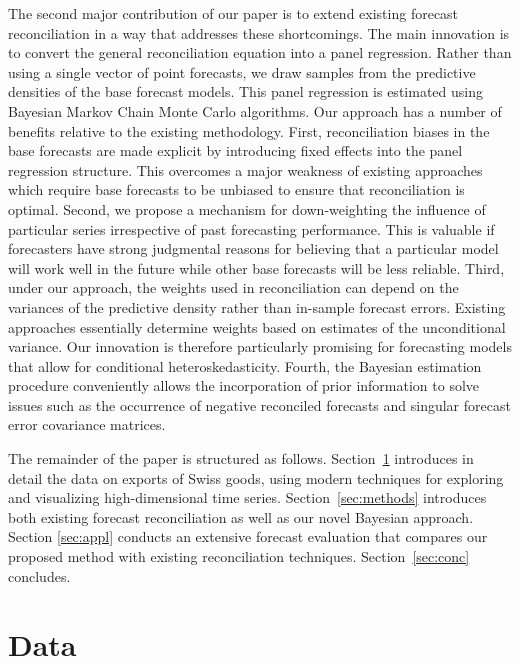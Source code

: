 \documentclass[a4paper,fleqn,11pt]{article}
\begin{document}
The second major contribution of our paper is to extend existing forecast reconciliation in a way that addresses these shortcomings. The main innovation is to convert the general reconciliation equation into a panel regression. Rather than using a single vector of point forecasts, we draw samples from the predictive densities of the base forecast models. This panel regression is estimated using Bayesian Markov Chain Monte Carlo algorithms. Our approach has a number of benefits relative to the existing methodology. First, reconciliation biases in the base forecasts are made explicit by introducing fixed effects into the panel regression structure. This overcomes a major weakness of existing approaches which require base forecasts to be unbiased to ensure that reconciliation is optimal. Second, we propose a mechanism for down-weighting the influence of particular series irrespective of past forecasting performance. This is valuable if forecasters have strong judgmental reasons for believing that a particular model will work well in the future while other base forecasts will be less reliable. Third, under our approach, the weights used in reconciliation can depend on the variances of the predictive density rather than in-sample forecast errors. Existing approaches essentially determine weights based on estimates of the unconditional variance. Our innovation is therefore particularly promising for forecasting models that allow for conditional heteroskedasticity. Fourth, the Bayesian estimation procedure conveniently allows the incorporation of prior information to solve issues such as the occurrence of negative reconciled forecasts and singular forecast error covariance matrices.

The remainder of the paper is structured as follows. Section~\ref{sec:datadesc} introduces in detail the data on exports of Swiss goods, using modern techniques for exploring and visualizing high-dimensional time series. Section~\ref{sec:methods} introduces both existing forecast reconciliation as well as our novel Bayesian approach. Section \ref{sec:appl} conducts an extensive forecast evaluation that compares our proposed method with existing reconciliation techniques. Section~\ref{sec:conc} concludes.

\section{Data}\label{sec:datadesc}
\end{document}
